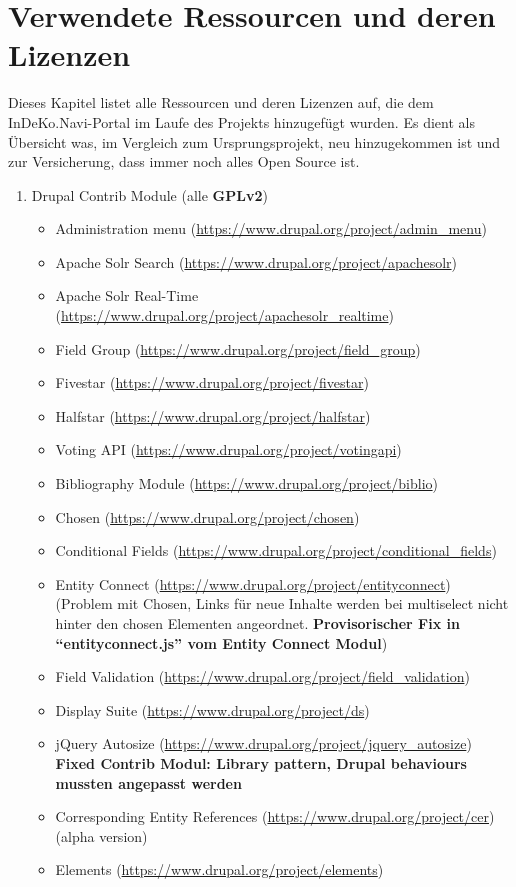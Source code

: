 \section{Verwendete Ressourcen und deren Lizenzen}\label{sub:license}
Dieses Kapitel listet alle Ressourcen und deren Lizenzen auf, die dem InDeKo.Navi-Portal im Laufe des Projekts hinzugefügt wurden. Es dient als Übersicht was, im Vergleich zum Ursprungsprojekt, neu hinzugekommen ist und zur Versicherung, dass immer noch alles Open Source ist.

\begin{enumerate}
	\item Drupal Contrib Module (alle \textbf{GPLv2})
	\begin{itemize}
		\item Administration menu (\url{https://www.drupal.org/project/admin_menu})
		\item Apache Solr Search (\url{https://www.drupal.org/project/apachesolr})
		\item Apache Solr Real-Time (\url{https://www.drupal.org/project/apachesolr_realtime})
		\item Field Group (\url{https://www.drupal.org/project/field_group})
		\item Fivestar (\url{https://www.drupal.org/project/fivestar})
		\item Halfstar (\url{https://www.drupal.org/project/halfstar})
		\item Voting API (\url{https://www.drupal.org/project/votingapi})
		\item Bibliography Module (\url{https://www.drupal.org/project/biblio})
		\item Chosen (\url{https://www.drupal.org/project/chosen})
		\item Conditional Fields (\url{https://www.drupal.org/project/conditional_fields})
		\item Entity Connect (\url{https://www.drupal.org/project/entityconnect}) (Problem mit Chosen, Links für neue Inhalte werden bei multiselect nicht hinter den chosen Elementen angeordnet. \textbf{Provisorischer Fix in \enquote{entityconnect.js} vom Entity Connect Modul})
		\item Field Validation (\url{https://www.drupal.org/project/field_validation})
		\item Display Suite (\url{https://www.drupal.org/project/ds})
		\item jQuery Autosize (\url{https://www.drupal.org/project/jquery_autosize}) \textbf{Fixed Contrib Modul: Library pattern, Drupal behaviours mussten angepasst werden}
		\item Corresponding Entity References (\url{https://www.drupal.org/project/cer}) (alpha version)  
		\item Elements (\url{https://www.drupal.org/project/elements})
	\end{itemize}


\end{enumerate}
